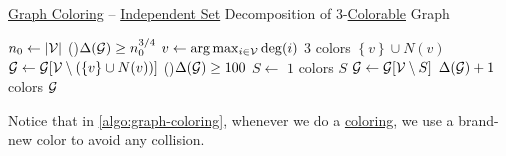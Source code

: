 \begin{algorithm}[H]\label{algo:graph-coloring}
	\DontPrintSemicolon
	\caption{\hyperref[prb:graph-coloring]{Graph Coloring} -- \hyperref[def:independent-set]{Independent Set} Decomposition of \(3\)-\hyperref[def:coloring]{Colorable} Graph}
	\BlankLine
	\(n_0\gets \left\vert \mathcal{\MakeUppercase{v}}  \right\vert \)\;
	\;
	\While(\label{algo:graph-coloring-phase-1}){\(\Delta (\mathcal{\MakeUppercase{g}} ) \geq n_0 ^{3 / 4}\)}{
	\(v\gets \arg\max _{i\in \mathcal{\MakeUppercase{v}} } \deg(i)\)\;
	\(3\) colors \(\left\{ v \right\} \cup N(v)\)
	\(\mathcal{\MakeUppercase{g}} \gets \mathcal{\MakeUppercase{g}} [\mathcal{\MakeUppercase{v}} \setminus (\left\{ v \right\} \cup N(v))]\)\;
	}
	\;
	\While(\label{algo:graph-coloring-phase-2}){\(\Delta (\mathcal{\MakeUppercase{g}} ) \geq 100\)}{
		\(S\gets\)
		\(1\) colors \(S\)\;
		\(\mathcal{\MakeUppercase{g}} \gets \mathcal{\MakeUppercase{g}} [\mathcal{\MakeUppercase{v}} \setminus S]\)\;
	}
	\;
	\(\Delta (\mathcal{\MakeUppercase{g}} ) + 1\) colors \(\mathcal{\MakeUppercase{g}} \)\label{algo:graph-coloring-phase-3}
	\;
\end{algorithm}

Notice that in \autoref{algo:graph-coloring}, whenever we do a \hyperref[def:coloring]{coloring}, we use a brand-new color to avoid any collision.

